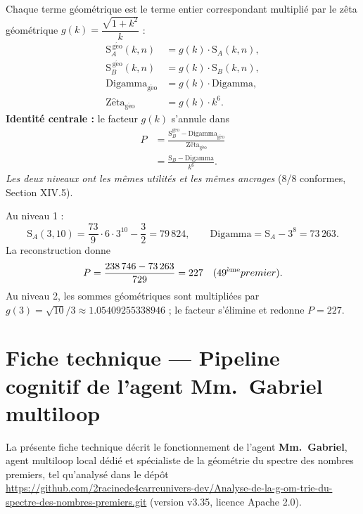 \documentclass[11pt,a4paper]{article}
\newcommand{\SA}{\mathrm{S}_A}
\newcommand{\SB}{\mathrm{S}_B}
\begin{document}
\vspace{0.3cm}
\begin{boiteformule}
Chaque terme géométrique est le terme entier correspondant multiplié par le
zêta géométrique $g(k) = \dfrac{\sqrt{1+k^{2}}}{k}$ :
\begin{align*}
\SA^{\,\mathrm{g\acute eo}}(k,n) &= g(k)\cdot\SA(k,n),\\
\SB^{\,\mathrm{g\acute eo}}(k,n) &= g(k)\cdot\SB(k,n),\\
\mathrm{Digamma}_{\mathrm{g\acute eo}} &= g(k)\cdot\mathrm{Digamma},\\
\mathrm{Z\hat eta}_{\mathrm{g\acute eo}} &= g(k)\cdot k^{6}.
\end{align*}
\textbf{Identité centrale :} le facteur $g(k)$ s'annule dans
\begin{align*}
P &= \frac{\SB^{\mathrm{g\acute eo}}-\mathrm{Digamma}_{\mathrm{g\acute eo}}}
{\mathrm{Z\hat eta}_{\mathrm{g\acute eo}}}\\
&= \frac{\SB-\mathrm{Digamma}}{k^{6}}.
\end{align*}
\emph{Les deux niveaux ont les mêmes utilités et les mêmes ancrages}
(8/8 conformes, Section XIV.5).
\end{boiteformule}

\vspace{0.3cm}
\begin{boitenote}
Au niveau 1 :
\[
\SA(3,10)=\frac{73}{9}\cdot6\cdot3^{10}-\frac{3}{2}=79\,824,
\qquad
\text{Digamma}=\SA-3^{8}=73\,263.
\]
La reconstruction donne
\[
P=\frac{238\,746-73\,263}{729}=227
\quad(49\textsuperscript{ème} premier).
\]
Au niveau 2, les sommes géométriques sont multipliées par
$g(3)=\sqrt{10}/3\approx1.05409255338946$ ; le facteur s'élimine et redonne
$P=227$.
\end{boitenote}


\section{Fiche technique --- Pipeline cognitif de l'agent Mm.\ Gabriel multiloop}

La présente fiche technique décrit le fonctionnement de l'agent \textbf{Mm.\
Gabriel}, agent multiloop local dédié et spécialiste de la géométrie du spectre
des nombres premiers, tel qu'analysé dans le dépôt
\url{https://github.com/2racinede4carreunivers-dev/Analyse-de-la-g-om-trie-du-spectre-des-nombres-premiers.git} (version v3.35, licence Apache 2.0).
\end{document}
